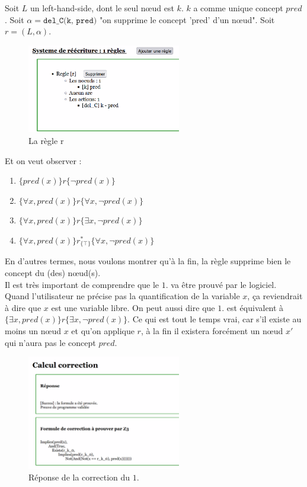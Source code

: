 \documentclass[11pt,a4paper]{article}
\begin{document}
Soit $L$ un left-hand-side, dont le seul nœud est $k$. $k$ a comme unique concept $pred$. Soit $\alpha =  \texttt{del\_C(k, pred)} $ "on supprime le concept 'pred' d'un nœud". Soit $r = (L, \alpha)$.


\begin{figure}[htbp]
  \centering
  \includegraphics[width=0.6\textwidth]{screen1.png}
  \caption{La règle r}
  \label{fig:mon_image}
\end{figure}

Et on veut observer : 
\begin{enumerate}
\item $\{pred(x)\}r\{\lnot pred(x)\}$
\item $\{\forall x, pred(x)\}r\{\forall x, \lnot pred(x)\}$
 \item $\{\forall x, pred(x)\}r\{\exists x, \lnot pred(x)\}$
\item $\{\forall x, pred(x)\}r^{*}_{\{\top\}}\{\forall x, \lnot pred(x)\}$
\end{enumerate}
En d'autres termes, nous voulons montrer qu'à la fin, la règle supprime bien le concept du (des) nœud(s).\\ 
Il est très important de comprendre que le $1.$ va être prouvé par le logiciel. Quand l'utilisateur ne précise pas la quantification de la variable $x$, ça reviendrait à dire que $x$ est une variable libre. On peut aussi dire que $1.$ est équivalent à $\{\exists x, pred(x)\}r\{\exists x, \lnot pred(x)\}$. Ce qui est tout le temps vrai, car s'il existe au moins un nœud $x$ et qu'on applique $r$, à la fin il existera forcément un nœud $x'$ qui n'aura pas le concept $pred$.

\begin{figure}[htbp]
  \centering
  \includegraphics[width=0.6\textwidth]{screen2.png}
  \caption{Réponse de la correction du $1.$}
  \label{fig:mon_image}
\end{figure}
\end{document}
